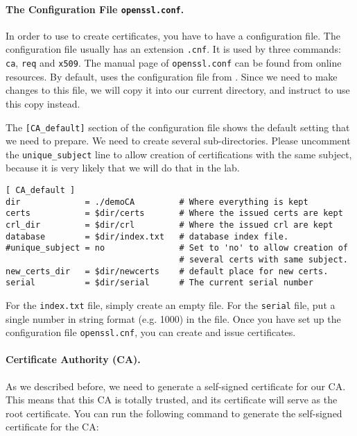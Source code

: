 \paragraph{The Configuration File {\tt openssl.conf}.}
In order to use \OpenSSL to create certificates, you have to have a 
configuration file.
The configuration file usually has an extension
{\tt .cnf}. It is used by three \OpenSSL commands: {\tt ca}, {\tt req} and {\tt x509}. 
The manual page of \texttt{openssl.conf} can be found from online resources. 
By default, \OpenSSL uses the configuration file from .
Since we need to make changes to this file, we will copy it 
into our current directory, and instruct \OpenSSL to use this copy instead. 


The \texttt{[CA\_default]} section of the configuration file shows the 
default setting that we need to prepare.  
We need to create several sub-directories. Please 
uncomment the \texttt{unique\_subject} line to allow 
creation of certifications with the same subject, because it is very
likely that we will do that in the lab. 


\begin{lstlisting}[caption={Default CA setting}]
[ CA_default ]
dir             = ./demoCA         # Where everything is kept
certs           = $dir/certs       # Where the issued certs are kept
crl_dir         = $dir/crl         # Where the issued crl are kept
database        = $dir/index.txt   # database index file.
#unique_subject = no               # Set to 'no' to allow creation of
                                   # several certs with same subject.
new_certs_dir   = $dir/newcerts    # default place for new certs.
serial          = $dir/serial      # The current serial number
\end{lstlisting}


For the \texttt{index.txt} file, simply create an empty file. For 
the \texttt{serial} file, put a single number in string format (e.g. 1000) in the file.
Once you have set up the configuration file \texttt{openssl.cnf}, 
you can create and issue certificates.


\paragraph{Certificate Authority (CA).} 
As we described before, we need to generate a self-signed certificate for our
CA. This means that this CA is totally trusted, and its certificate will serve
as the root certificate.  You can run the following command to generate  
the self-signed certificate for the CA:


